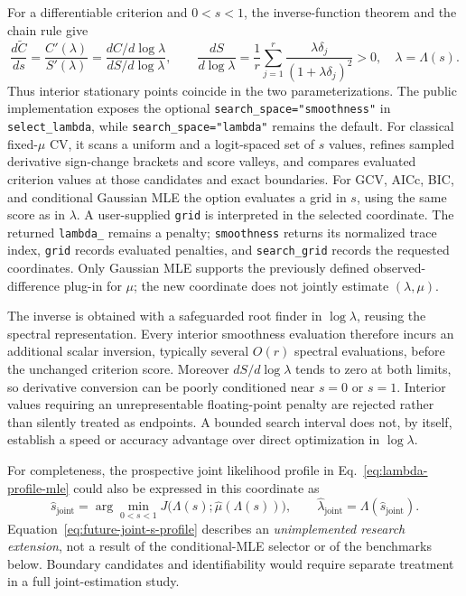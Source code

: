 For a differentiable criterion and $0<s<1$, the inverse-function
theorem and the chain rule give
\begin{equation}\label{eq:score-s-chain}
\frac{d\widetilde C}{ds}
=\frac{C'(\lambda)}{S'(\lambda)}
=\frac{dC/d\log\lambda}{dS/d\log\lambda},
\qquad
\frac{dS}{d\log\lambda}
=\frac{1}{r}\sum_{j=1}^{r}
\frac{\lambda\delta_j}{(1+\lambda\delta_j)^2}>0,
\quad\lambda=\Lambda(s).
\end{equation}
Thus interior stationary points coincide in the two
parameterizations. The public implementation exposes the optional
\texttt{search\_space="smoothness"} in
\texttt{select\_lambda}, while
\texttt{search\_space="lambda"} remains the default.
For classical fixed-$\mu$ CV, it scans a uniform and a
logit-spaced set of $s$ values, refines sampled derivative
sign-change brackets and score valleys, and compares evaluated
criterion values at those candidates and exact boundaries.
For GCV, AICc, BIC, and conditional Gaussian MLE the option
evaluates a grid in $s$, using the same score as in $\lambda$.
A user-supplied \texttt{grid} is interpreted in the selected
coordinate. The returned \texttt{lambda\_} remains a penalty;
\texttt{smoothness} returns its normalized trace index,
\texttt{grid} records evaluated penalties, and
\texttt{search\_grid} records the requested coordinates.
Only Gaussian MLE supports the previously defined
observed-difference plug-in for $\mu$; the new coordinate does
not jointly estimate $(\lambda,\mu)$.

The inverse is obtained with a safeguarded root finder in
$\log\lambda$, reusing the spectral representation.
Every interior smoothness evaluation therefore incurs an
additional scalar inversion, typically several $O(r)$
spectral evaluations, before the unchanged criterion score.
Moreover $dS/d\log\lambda$ tends to zero at both limits, so
derivative conversion can be poorly conditioned near $s=0$
or $s=1$. Interior values requiring an unrepresentable
floating-point penalty are rejected rather than silently
treated as endpoints. A bounded search interval does not,
by itself, establish a speed or accuracy advantage over
direct optimization in $\log\lambda$.

For completeness, the prospective joint likelihood profile
in Eq.~\eqref{eq:lambda-profile-mle} could also be expressed
in this coordinate as
\begin{equation}\label{eq:future-joint-s-profile}
\widehat s_{\mathrm{joint}}
=\arg\min_{0<s<1}
J\bigl(\Lambda(s);\widehat\mu(\Lambda(s))\bigr),
\qquad
\widehat\lambda_{\mathrm{joint}}
=\Lambda(\widehat s_{\mathrm{joint}}).
\end{equation}
Equation~\eqref{eq:future-joint-s-profile} describes an
\emph{unimplemented research extension}, not a result of
the conditional-MLE selector or of the benchmarks below.
Boundary candidates and identifiability would require
separate treatment in a full joint-estimation study.
